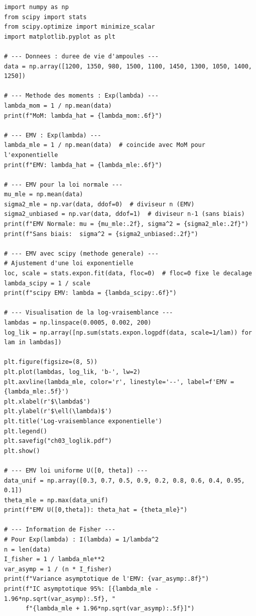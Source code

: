 \begin{python}
\begin{verbatim}
import numpy as np
from scipy import stats
from scipy.optimize import minimize_scalar
import matplotlib.pyplot as plt

# --- Donnees : duree de vie d'ampoules ---
data = np.array([1200, 1350, 980, 1500, 1100, 1450, 1300, 1050, 1400, 1250])

# --- Methode des moments : Exp(lambda) ---
lambda_mom = 1 / np.mean(data)
print(f"MoM: lambda_hat = {lambda_mom:.6f}")

# --- EMV : Exp(lambda) ---
lambda_mle = 1 / np.mean(data)  # coincide avec MoM pour l'exponentielle
print(f"EMV: lambda_hat = {lambda_mle:.6f}")

# --- EMV pour la loi normale ---
mu_mle = np.mean(data)
sigma2_mle = np.var(data, ddof=0)  # diviseur n (EMV)
sigma2_unbiased = np.var(data, ddof=1)  # diviseur n-1 (sans biais)
print(f"EMV Normale: mu = {mu_mle:.2f}, sigma^2 = {sigma2_mle:.2f}")
print(f"Sans biais:  sigma^2 = {sigma2_unbiased:.2f}")

# --- EMV avec scipy (methode generale) ---
# Ajustement d'une loi exponentielle
loc, scale = stats.expon.fit(data, floc=0)  # floc=0 fixe le decalage
lambda_scipy = 1 / scale
print(f"scipy EMV: lambda = {lambda_scipy:.6f}")

# --- Visualisation de la log-vraisemblance ---
lambdas = np.linspace(0.0005, 0.002, 200)
log_lik = np.array([np.sum(stats.expon.logpdf(data, scale=1/lam)) for lam in lambdas])

plt.figure(figsize=(8, 5))
plt.plot(lambdas, log_lik, 'b-', lw=2)
plt.axvline(lambda_mle, color='r', linestyle='--', label=f'EMV = {lambda_mle:.5f}')
plt.xlabel(r'$\lambda$')
plt.ylabel(r'$\ell(\lambda)$')
plt.title('Log-vraisemblance exponentielle')
plt.legend()
plt.savefig("ch03_loglik.pdf")
plt.show()

# --- EMV loi uniforme U([0, theta]) ---
data_unif = np.array([0.3, 0.7, 0.5, 0.9, 0.2, 0.8, 0.6, 0.4, 0.95, 0.1])
theta_mle = np.max(data_unif)
print(f"EMV U([0,theta]): theta_hat = {theta_mle}")

# --- Information de Fisher ---
# Pour Exp(lambda) : I(lambda) = 1/lambda^2
n = len(data)
I_fisher = 1 / lambda_mle**2
var_asymp = 1 / (n * I_fisher)
print(f"Variance asymptotique de l'EMV: {var_asymp:.8f}")
print(f"IC asymptotique 95%: [{lambda_mle - 1.96*np.sqrt(var_asymp):.5f}, "
      f"{lambda_mle + 1.96*np.sqrt(var_asymp):.5f}]")
\end{verbatim}
\end{python}

